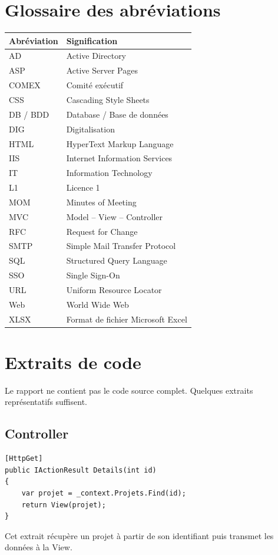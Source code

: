 \documentclass[12pt,a4paper,oneside]{report}
\begin{document}
\chapter{Glossaire des abréviations}
\begin{longtable}{p{4cm}p{10cm}}\toprule
\textbf{Abréviation}&\textbf{Signification}\\\midrule
AD&Active Directory\\
ASP&Active Server Pages\\
COMEX&Comité exécutif\\
CSS&Cascading Style Sheets\\
DB / BDD&Database / Base de données\\
DIG&Digitalisation\\
HTML&HyperText Markup Language\\
IIS&Internet Information Services\\
IT&Information Technology\\
L1&Licence 1\\
MOM&Minutes of Meeting\\
MVC&Model -- View -- Controller\\
RFC&Request for Change\\
SMTP&Simple Mail Transfer Protocol\\
SQL&Structured Query Language\\
SSO&Single Sign-On\\
URL&Uniform Resource Locator\\
Web&World Wide Web\\
XLSX&Format de fichier Microsoft Excel\\
\bottomrule\end{longtable}

\appendix
\chapter{Extraits de code}
Le rapport ne contient pas le code source complet. Quelques extraits représentatifs suffisent.

\section{Controller}
\begin{lstlisting}[language={[Sharp]C}]
[HttpGet]
public IActionResult Details(int id)
{
    var projet = _context.Projets.Find(id);
    return View(projet);
}
\end{lstlisting}
Cet extrait récupère un projet à partir de son identifiant puis transmet les données à la View.
\end{document}
